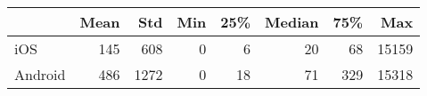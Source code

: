 \begin{tabular}{lrrrrrrr}
\hline
         &   Mean &   Std &   Min &   25\% &   Median &   75\% &   Max \\
\hline
 iOS     &    145 &   608 &     0 &     6 &       20 &    68 & 15159 \\
 Android &    486 &  1272 &     0 &    18 &       71 &   329 & 15318 \\
\hline
\end{tabular}
